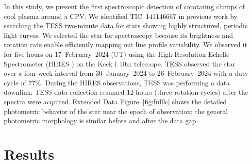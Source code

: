 \documentclass{nature3}
\begin{document}
In this study, we present the first spectroscopic detection of
corotating clumps of cool plasma around a CPV.  We identified
TIC~141146667 in previous work \cite{Bouma2024} by searching the TESS
two-minute data \cite{Ricker2015} for stars showing highly structured,
periodic light curves.  We selected the star for spectroscopy because
its brightness and rotation rate enable efficiently mapping out line
profile variability.  We observed it for five hours on
17~February~2024 (UT) using the High Resolution Echelle Spectrometer
(HIRES \cite{vogt_hires_1994}) on the Keck I 10m telescope.  TESS
observed the star over a four week interval from 30~January~2024 to
26~February~2024 with a duty cycle of 77\%.  During the HIRES
observations, TESS was performing a data downlink; TESS data
collection resumed 12 hours (three rotation cycles) after the spectra
were acquired.  Extended Data Figure~\ref{fig:fulllc} shows the
detailed photometric behavior of the star near the epoch of
observation; the general photometric morphology is similar before and
after the data gap.


\section{Results}
\end{document}
